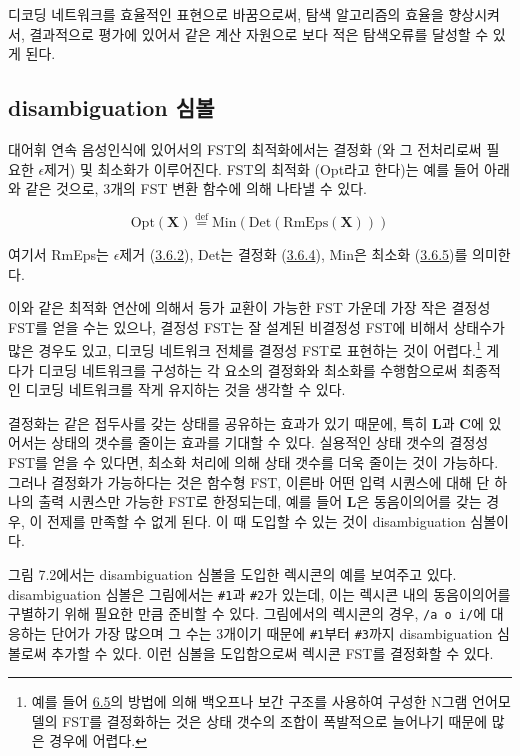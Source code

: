 \documentclass[../main.tex]{subfiles}
\begin{document}
디코딩 네트워크를 효율적인 표현으로 바꿈으로써, 탐색 알고리즘의 효율을 향상시켜서, 결과적으로 평가에 있어서 같은 계산 자원으로 보다 적은 탐색오류를 달성할 수 있게 된다. 

\subsection{disambiguation 심볼}
대어휘 연속 음성인식에 있어서의 FST의 최적화에서는 결정화 (와 그 전처리로써 필요한 $\epsilon$제거) 및 최소화가 이루어진다. 
FST의 최적화 (Opt라고 한다)는 예를 들어 아래와 같은 것으로, 3개의 FST 변환 함수에 의해 나타낼 수 있다. 

\begin{equation}
    \text{Opt}(\bm{X}) \stackrel{\text{def}}{=} \text{Min}(\text{Det}(\text{RmEps}(\bm{X})))
\end{equation}

여기서 RmEps는 $\epsilon$제거 (\hyperref[subsec:epsilon-remove]{3.6.2}), Det는 결정화 (\hyperref[subsec:determinization]{3.6.4}), Min은 최소화 (\hyperref[subsec:minimization]{3.6.5})를 의미한다. 

이와 같은 최적화 연산에 의해서 등가 교환이 가능한 FST 가운데 가장 작은 결정성 FST를 얻을 수는 있으나, 결정성 FST는 잘 설계된 비결정성 FST에 비해서 상태수가 많은 경우도 있고, 디코딩 네트워크 전체를 결정성 FST로 표현하는 것이 어렵다.\footnote{예를 들어 \hyperref[sec:N-gram-FST]{6.5}의 방법에 의해 백오프나 보간 구조를 사용하여 구성한 N그램 언어모델의 FST를 결정화하는 것은 상태 갯수의 조합이 폭발적으로 늘어나기 때문에 많은 경우에 어렵다.}
게다가 디코딩 네트워크를 구성하는 각 요소의 결정화와 최소화를 수행함으로써 최종적인 디코딩 네트워크를 작게 유지하는 것을 생각할 수 있다. 

결정화는 같은 접두사를 갖는 상태를 공유하는 효과가 있기 때문에, 특히 $\bm{L}$과 $\bm{C}$에 있어서는 상태의 갯수를 줄이는 효과를 기대할 수 있다. 
실용적인 상태 갯수의 결정성 FST를 얻을 수 있다면, 최소화 처리에 의해 상태 갯수를 더욱 줄이는 것이 가능하다. 
그러나 결정화가 가능하다는 것은 함수형 FST, 이른바 어떤 입력 시퀀스에 대해 단 하나의 출력 시퀀스만 가능한 FST로 한정되는데, 예를 들어 $\bm{L}$은 동음이의어를 갖는 경우, 이 전제를 만족할 수 없게 된다. 
이 때 도입할 수 있는 것이 disambiguation 심볼이다. 

그림 7.2에서는 disambiguation 심볼을 도입한 렉시콘의 예를 보여주고 있다. 
disambiguation 심볼은 그림에서는 \texttt{\#1}과 \texttt{\#2}가 있는데, 이는 렉시콘 내의 동음이의어를 구별하기 위해 필요한 만큼 준비할 수 있다. 
그림에서의 렉시콘의 경우, \texttt{/a o i/}에 대응하는 단어가 가장 많으며 그 수는 3개이기 때문에 \texttt{\#1}부터 \texttt{\#3}까지 disambiguation 심볼로써 추가할 수 있다. 
이런 심볼을 도입함으로써 렉시콘 FST를 결정화할 수 있다. 
\end{document}
